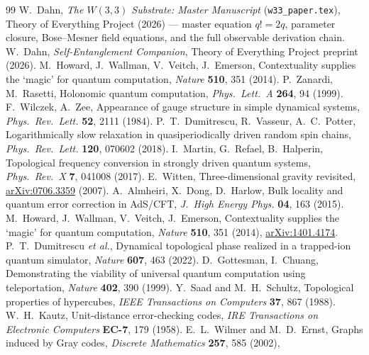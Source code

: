 \documentclass[11pt]{article}
\begin{document}
\begin{thebibliography}{99}
 W.~Dahn, \emph{The $W(3,3)$ Substrate: Master
  Manuscript} (\texttt{w33\_paper.tex}), Theory of Everything Project
  (2026) --- master equation $q!=2q$, parameter closure, Bose--Mesner
  field equations, and the full observable derivation chain.
 W.~Dahn, \emph{Self-Entanglement Companion},
  Theory of Everything Project preprint (2026).
 M.~Howard, J.~Wallman, V.~Veitch, J.~Emerson,
  Contextuality supplies the `magic' for quantum computation,
  \emph{Nature} \textbf{510}, 351 (2014).
 P.~Zanardi, M.~Rasetti,
  Holonomic quantum computation, \emph{Phys.\ Lett.\ A} \textbf{264}, 94 (1999).
 F.~Wilczek, A.~Zee,
  Appearance of gauge structure in simple dynamical systems,
  \emph{Phys.\ Rev.\ Lett.} \textbf{52}, 2111 (1984).
 P.~T.~Dumitrescu, R.~Vasseur, A.~C.~Potter,
  Logarithmically slow relaxation in quasiperiodically driven random spin
  chains, \emph{Phys.\ Rev.\ Lett.} \textbf{120}, 070602 (2018).
 I.~Martin, G.~Refael, B.~Halperin,
  Topological frequency conversion in strongly driven quantum systems,
  \emph{Phys.\ Rev.\ X} \textbf{7}, 041008 (2017).
 E.~Witten, Three-dimensional gravity revisited,
  \href{https://arxiv.org/abs/0706.3359}{arXiv:0706.3359} (2007).
 A.~Almheiri, X.~Dong, D.~Harlow, Bulk locality and quantum error
  correction in AdS/CFT, \emph{J.\ High Energy Phys.} \textbf{04}, 163 (2015).
 M.~Howard, J.~Wallman, V.~Veitch, J.~Emerson, Contextuality
  supplies the `magic' for quantum computation, \emph{Nature} \textbf{510}, 351
  (2014), \href{https://arxiv.org/abs/1401.4174}{arXiv:1401.4174}.
 P.~T.~Dumitrescu \emph{et al.},
  Dynamical topological phase realized in a trapped-ion quantum
  simulator, \emph{Nature} \textbf{607}, 463 (2022).
 D.~Gottesman, I.~Chuang,
  Demonstrating the viability of universal quantum computation using
  teleportation, \emph{Nature} \textbf{402}, 390 (1999).
 Y.~Saad and M.~H.~Schultz,
  Topological properties of hypercubes,
  \emph{IEEE Transactions on Computers} \textbf{37}, 867 (1988).
 W.~H.~Kautz,
  Unit-distance error-checking codes,
  \emph{IRE Transactions on Electronic Computers} \textbf{EC-7}, 179 (1958).
 E.~L.~Wilmer and M.~D.~Ernst,
  Graphs induced by Gray codes,
  \emph{Discrete Mathematics} \textbf{257}, 585 (2002),

\end{thebibliography}
\end{document}
